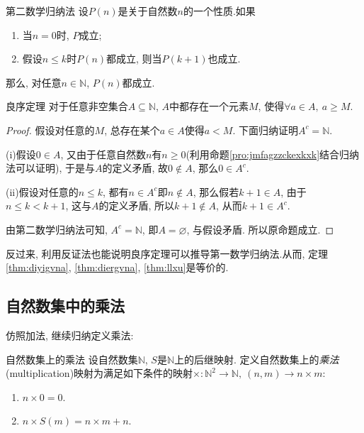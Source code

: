 \begin{theorem}{第二数学归纳法} \label{thm:diergvna}
	设$P(n)$是关于自然数$n$的一个性质.如果
	\begin{enumerate}
		\item 当$n=0$时, $P$成立; 
		\item 假设$n \leq k$时$P(n)$都成立, 则当$P(k+1)$也成立.
	\end{enumerate}
	那么, 对任意$n \in \mathbb{N}$, $P(n)$都成立.
\end{theorem}

\begin{theorem}{良序定理} \label{thm:llxu}
	对于任意非空集合$A \subseteq \mathbb{N}$, $A$中都存在一个元素$M$, 使得$\forall a \in A, ~a \geq M$.
\end{theorem}
\begin{proof}
	假设对任意的$M$, 总存在某个$a \in A$使得$a < M$. 下面归纳证明$A^c = \mathbb{N}$. 
	
	(i)假设$0 \in A$, 又由于任意自然数$n$有$n \geq 0$(利用命题\ref{pro:jmfagzzckexkxk}结合归纳法可以证明), 于是与$A$的定义矛盾, 故$0 \notin A$, 那么$0 \in A^c$. 
	
	(ii)假设对任意的$n \leq k$, 都有$n \in A^c$即$n \notin A$, 那么假若$k+1 \in A$, 由于$n \leq k < k+1$, 这与$A$的定义矛盾, 所以$k+1 \notin A$, 从而$k+1 \in A^c$. 
	
	由第二数学归纳法可知, $A^c = \mathbb{N}$, 即$A = \varnothing$, 与假设矛盾. 所以原命题成立.
\end{proof}

反过来, 利用反证法也能说明良序定理可以推导第一数学归纳法.从而, 定理\ref{thm:diyigvna}, \ref{thm:diergvna}, \ref{thm:llxu}是等价的.

\subsection{自然数集中的乘法}

仿照加法, 继续归纳定义乘法: 

\begin{definition}{自然数集上的乘法}
	设自然数集$\mathbb{N}$, $S$是$\mathbb{N}$上的后继映射. 定义自然数集上的\textit{乘法}(multiplication)映射为满足如下条件的映射$\times : \mathbb{N}^2 \to \mathbb{N}, ~(n, m) \to n \times m$: 
	\begin{enumerate}
		\item $n\times 0=0$.
		\item $n\times S(m)=n\times m+n$.
	\end{enumerate}
\end{definition}

